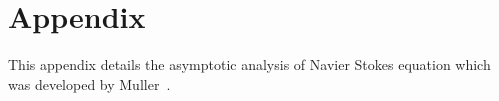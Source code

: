 \chapter{Appendix}\label{chap:app}

 This appendix details the asymptotic analysis of Navier Stokes equation which was developed by Muller~\cite{Muller}. 
 
 
 






